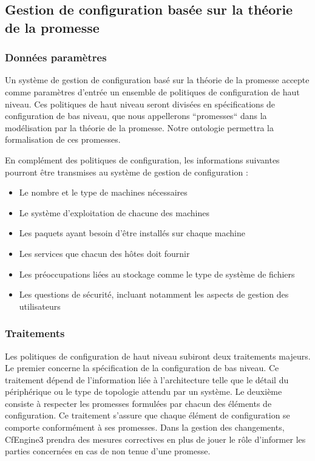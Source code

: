 
\subsection{Gestion de configuration basée sur la théorie de la promesse}

\subsubsection{Données paramètres}

Un système de gestion de configuration basé sur la théorie de la promesse
accepte comme paramètres d'entrée un ensemble de politiques de configuration de
haut niveau. Ces politiques de haut niveau seront divisées en spécifications de
configuration de bas niveau, que nous appellerons ``promesses`` dans la
modélisation par la théorie de la promesse. Notre ontologie permettra la
formalisation de ces promesses.

En complément des politiques de configuration, les informations suivantes
pourront être transmises au système de gestion de configuration :

\begin{itemize}
    \item Le nombre et le type de machines nécessaires
    \item Le système d'exploitation de chacune des machines
    \item Les paquets ayant besoin d'être installés sur chaque machine
    \item Les services que chacun des hôtes doit fournir
    \item Les préoccupations liées au stockage comme le type de système de
        fichiers
    \item Les questions de sécurité, incluant notamment les aspects de gestion
        des utilisateurs
\end{itemize}

\subsubsection{Traitements}

Les politiques de configuration de haut niveau subiront deux traitements
majeurs. Le premier concerne la spécification de la configuration de bas
niveau. Ce traitement dépend de l'information liée à l'architecture telle que le
détail du périphérique ou le type de topologie attendu par un système.
Le deuxième consiste à respecter les promesses formulées par chacun des éléments
de configuration. Ce traitement s'assure que chaque élément de configuration se
comporte conformément à ses promesses. Dans la gestion des changements,
CfEngine3 prendra des mesures correctives en plus de jouer le rôle d'informer
les parties concernées en cas de non tenue d'une promesse.

